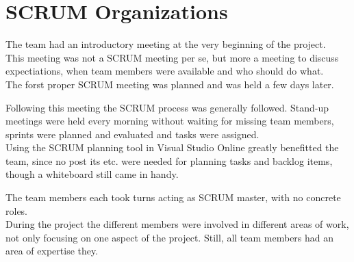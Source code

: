 \section{SCRUM Organizations}
The team had an introductory meeting at the very beginning of the project. \\
This meeting was not a SCRUM meeting per se, but more a meeting to discuss expectiations, when team members were available and who should do what.\\
The forst proper SCRUM meeting was planned and was held a few days later.

Following this meeting the SCRUM process was generally followed. Stand-up meetings were held every morning without waiting for missing team members, sprints were planned and evaluated and tasks were assigned. \\
Using the SCRUM planning tool in Visual Studio Online greatly benefitted the team, since no post its etc. were needed for planning tasks and backlog items, though a whiteboard still came in handy.

The team members each took turns acting as SCRUM master, with no concrete roles.\\
During the project the different members were involved in different areas of work, not only focusing on one aspect of the project. Still, all team members had an area of expertise they.